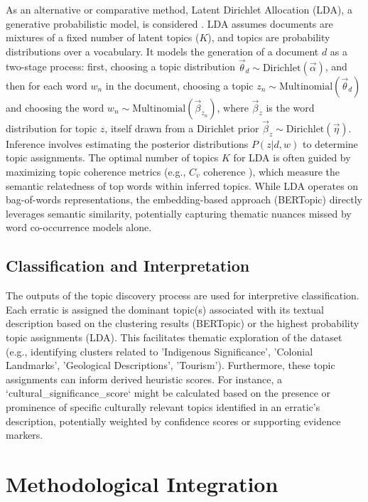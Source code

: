 As an alternative or comparative method, Latent Dirichlet Allocation (LDA), a generative probabilistic model, is considered \cite{Blei2003}. LDA assumes documents are mixtures of a fixed number of latent topics ($K$), and topics are probability distributions over a vocabulary. It models the generation of a document $d$ as a two-stage process: first, choosing a topic distribution $\vec{\theta}_d \sim \text{Dirichlet}(\vec{\alpha})$, and then for each word $w_n$ in the document, choosing a topic $z_n \sim \text{Multinomial}(\vec{\theta}_d)$ and choosing the word $w_n \sim \text{Multinomial}(\vec{\beta}_{z_n})$, where $\vec{\beta}_z$ is the word distribution for topic $z$, itself drawn from a Dirichlet prior $\vec{\beta}_z \sim \text{Dirichlet}(\vec{\eta})$. Inference involves estimating the posterior distributions $P(z|d, w)$ to determine topic assignments. The optimal number of topics $K$ for LDA is often guided by maximizing topic coherence metrics (e.g., $C_v$ coherence \cite{Roder2015}), which measure the semantic relatedness of top words within inferred topics. While LDA operates on bag-of-words representations, the embedding-based approach (BERTopic) directly leverages semantic similarity, potentially capturing thematic nuances missed by word co-occurrence models alone.

\subsection{Classification and Interpretation}
\label{subsec:classification_interpretation}

The outputs of the topic discovery process are used for interpretive classification. Each erratic is assigned the dominant topic(s) associated with its textual description based on the clustering results (BERTopic) or the highest probability topic assignments (LDA). This facilitates thematic exploration of the dataset (e.g., identifying clusters related to 'Indigenous Significance', 'Colonial Landmarks', 'Geological Descriptions', 'Tourism'). Furthermore, these topic assignments can inform derived heuristic scores. For instance, a `cultural\_significance\_score` might be calculated based on the presence or prominence of specific culturally relevant topics identified in an erratic's description, potentially weighted by confidence scores or supporting evidence markers.

\section{Methodological Integration}
\label{sec:integration}

